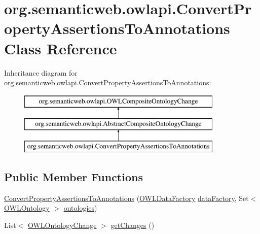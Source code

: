 \hypertarget{classorg_1_1semanticweb_1_1owlapi_1_1_convert_property_assertions_to_annotations}{\section{org.\-semanticweb.\-owlapi.\-Convert\-Property\-Assertions\-To\-Annotations Class Reference}
\label{classorg_1_1semanticweb_1_1owlapi_1_1_convert_property_assertions_to_annotations}
}
Inheritance diagram for org.\-semanticweb.\-owlapi.\-Convert\-Property\-Assertions\-To\-Annotations\-:\begin{figure}[H]
\begin{center}
\leavevmode
\includegraphics[height=3.000000cm]{classorg_1_1semanticweb_1_1owlapi_1_1_convert_property_assertions_to_annotations}
\end{center}
\end{figure}
\subsection*{Public Member Functions}
\begin{DoxyCompactItemize}
\item 
\hyperlink{classorg_1_1semanticweb_1_1owlapi_1_1_convert_property_assertions_to_annotations_ac818e6530f164a5c8344636bb7710298}{Convert\-Property\-Assertions\-To\-Annotations} (\hyperlink{interfaceorg_1_1semanticweb_1_1owlapi_1_1model_1_1_o_w_l_data_factory}{O\-W\-L\-Data\-Factory} \hyperlink{classorg_1_1semanticweb_1_1owlapi_1_1_abstract_composite_ontology_change_aebcfd0601543ebb5f72b1fe53a5352c9}{data\-Factory}, Set$<$ \hyperlink{interfaceorg_1_1semanticweb_1_1owlapi_1_1model_1_1_o_w_l_ontology}{O\-W\-L\-Ontology} $>$ \hyperlink{classorg_1_1semanticweb_1_1owlapi_1_1_convert_property_assertions_to_annotations_aefff3119363370dbba8d0019cd449ce6}{ontologies})
\item 
List$<$ \hyperlink{classorg_1_1semanticweb_1_1owlapi_1_1model_1_1_o_w_l_ontology_change}{O\-W\-L\-Ontology\-Change} $>$ \hyperlink{classorg_1_1semanticweb_1_1owlapi_1_1_convert_property_assertions_to_annotations_a2d1657f0011363abe9f6ffa22ec3e485}{get\-Changes} ()
\end{DoxyCompactItemize}
